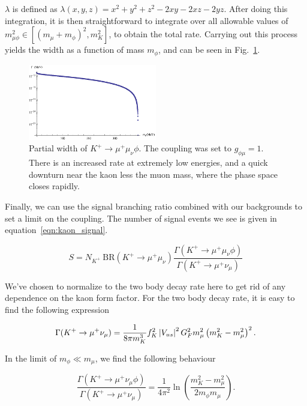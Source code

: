 \noindent $\lambda$ is defined as $\lambda(x,y,z) = x^2 + y^2 + z^2 - 2xy -2xz - 2yz$.
After doing this integration, it is then straightforward to integrate over all allowable values of $m_{\mu\phi}^2 \in [(m_\mu + m_\phi)^2, m_K^2]$, to obtain the total rate.
Carrying out this process yields the width as a function of mass $m_\phi$, and can be seen in Fig.~\ref{fig:kaon_width}.

\begin{figure}[h]
    \centering
    \includegraphics[width=0.5\textwidth]{Figures/kaon/kaon_width}
    \caption{Partial width of $K^+ \rightarrow \mu^+ \mu_\nu \phi$. The coupling was set to $g_{\phi\mu}=1$. There is an increased rate at extremely low energies, and a quick downturn near the kaon less the muon mass, where the phase space closes rapidly.}
    \label{fig:kaon_width}
\end{figure}

Finally, we can use the signal branching ratio combined with our backgrounds to set a limit on the coupling.
The number of signal events we see is given in equation~\ref{eqn:kaon_signal}.

\begin{equation}
    S = N_{K^+}~\textrm{BR}(K^+ \rightarrow \mu^+ \mu_\nu) \frac{\Gamma(K^+ \rightarrow \mu^+ \mu_\nu \phi)}{\Gamma(K^+ \rightarrow \mu^+ \nu_\mu)}
    \label{eqn:kaon_signal}
\end{equation}

\noindent We've chosen to normalize to the two body decay rate here to get rid of any dependence on the kaon form factor.
For the two body decay rate, it is easy to find the following expression

\begin{equation}
    \Gamma(K^+ \rightarrow \mu^+ \nu_\mu) = \frac{1}{8\pi m_K^3}\mathnormal{f}_K^2 \left|V_{us}\right|^2 G_F^2 m_\mu^2 \left(m_K^2 - m_\mu^2\right)^2\textrm{.}
\end{equation}

\noindent In the limit of $m_\phi \ll m_\mu$, we find the following behaviour

\begin{equation}
    \frac{\Gamma(K^+ \rightarrow \mu^+ \nu_\mu \phi)}{\Gamma(K^+ \rightarrow \mu^+ \nu_\mu)} = \frac{1}{4\pi^2} \ln\left(\frac{m_K^2 - m_\mu^2}{2 m_\phi m_\mu} \right)\textrm{.}
\end{equation}

